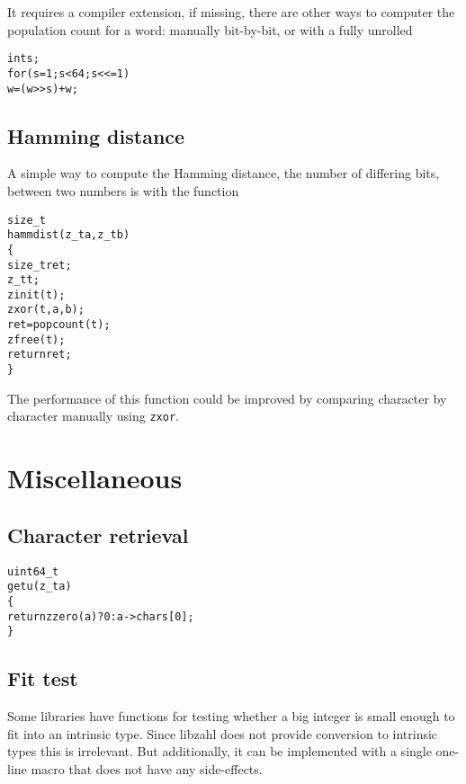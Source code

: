 \noindent
It requires a compiler extension, if missing,
there are other ways to computer the population
count for a word: manually bit-by-bit, or with
a fully unrolled

\begin{alltt}
   int s;
   for (s = 1; s < 64; s <<= 1)
       w = (w >> s) + w;
\end{alltt}


\subsection{Hamming distance}
\label{sec:Hamming distance}

A simple way to compute the Hamming distance,
the number of differing bits, between two
numbers is with the function

\begin{alltt}
   size_t
   hammdist(z_t a, z_t b)
   \{
       size_t ret;
       z_t t;
       zinit(t);
       zxor(t, a, b);
       ret = popcount(t);
       zfree(t);
       return ret;
   \}
\end{alltt}

\noindent
The performance of this function could
be improved by comparing character by
character manually using {\tt zxor}.


\newpage
\section{Miscellaneous}
\label{sec:Miscellaneous}


\subsection{Character retrieval}
\label{sec:Character retrieval}

\begin{alltt}
uint64_t
getu(z_t a)
\{
    return zzero(a) ? 0 : a->chars[0];
\}
\end{alltt}

\subsection{Fit test}
\label{sec:Fit test}

Some libraries have functions for testing
whether a big integer is small enough to
fit into an intrinsic type. Since libzahl
does not provide conversion to intrinsic
types this is irrelevant. But additionally,
it can be implemented with a single
one-line macro that does not have any
side-effects.


